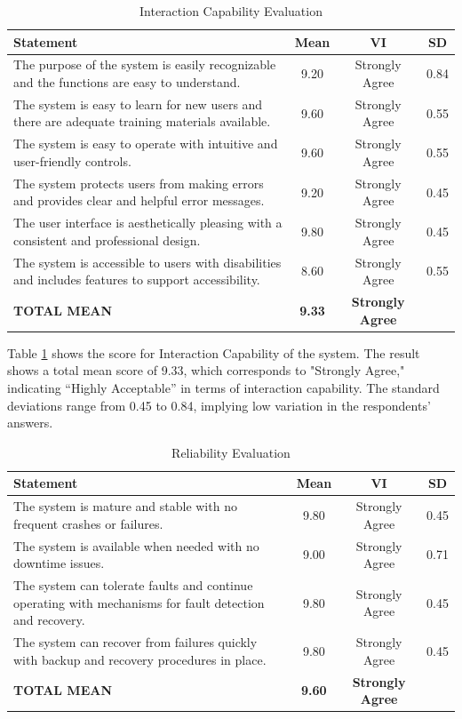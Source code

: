 \documentclass[12pt,a4paper,]{article}
\begin{document}
	
	\begin{table}[h!]
		\centering
		\caption{Interaction Capability Evaluation}
		\label{intcap}
		\renewcommand{\arraystretch}{1.2}
		\begin{tabularx}{\linewidth}{|X|c|c|c|}
			\hline
			\textbf{Statement} & \textbf{Mean} & \textbf{VI} & \textbf{SD} \\ \hline
			The purpose of the system is easily recognizable and the functions are easy to understand.
			& 9.20 & Strongly Agree & 0.84 \\ \hline
			The system is easy to learn for new users and there are adequate training materials available.
			& 9.60 & Strongly Agree & 0.55 \\ \hline
			The system is easy to operate with intuitive and user-friendly controls.
			& 9.60 & Strongly Agree & 0.55 \\ \hline
			The system protects users from making errors and provides clear and helpful error messages.
			& 9.20 & Strongly Agree & 0.45 \\ \hline
			The user interface is aesthetically pleasing with a consistent and professional design.
			& 9.80 & Strongly Agree & 0.45 \\ \hline
			The system is accessible to users with disabilities and includes features to support accessibility.
			& 8.60 & Strongly Agree & 0.55 \\ \hline
			\textbf{TOTAL MEAN} & \textbf{9.33} & \textbf{Strongly Agree} & \\ \hline
		\end{tabularx}
	\end{table}
	
	Table \ref{intcap} shows the score for Interaction Capability of the system. The result shows a total mean score of 9.33, which corresponds to "Strongly Agree," indicating “Highly Acceptable” in terms of interaction capability. The standard deviations range from 0.45 to 0.84, implying low variation in the respondents’ answers.
	
	\begin{table}[h!]
		\centering
		\caption{Reliability Evaluation}
		\label{relblty}
		\renewcommand{\arraystretch}{1.2}
		\begin{tabularx}{\linewidth}{|X|c|c|c|}
			\hline
			\textbf{Statement} & \textbf{Mean} & \textbf{VI} & \textbf{SD} \\ \hline
			The system is mature and stable with no frequent crashes or failures.
			& 9.80 & Strongly Agree & 0.45 \\ \hline
			The system is available when needed with no downtime issues.
			& 9.00 & Strongly Agree & 0.71 \\ \hline
			The system can tolerate faults and continue operating with mechanisms for fault detection and recovery.
			& 9.80 & Strongly Agree & 0.45 \\ \hline
			The system can recover from failures quickly with backup and recovery procedures in place.
			& 9.80 & Strongly Agree & 0.45\\ \hline
			\textbf{TOTAL MEAN} & \textbf{9.60} & \textbf{Strongly Agree} & \\ \hline
		\end{tabularx}
	\end{table}
	
\end{document}
